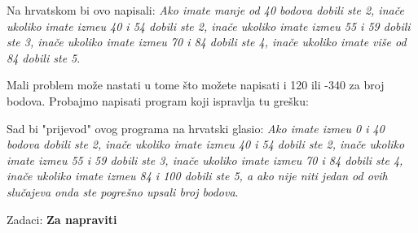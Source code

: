 Na hrvatskom bi ovo napisali: \emph{Ako imate manje od 40 bodova dobili ste 2, ina\v{c}e ukoliko imate
izme\dj{}u 40 i 54 dobili ste 2, ina\v{c}e ukoliko imate izme\dj{}u 55 i 59 dobili ste 3, ina\v{c}e ukoliko imate
izme\dj{}u 70 i 84 dobili ste 4, ina\v{c}e ukoliko imate vi\v{s}e od 84 dobili ste 5}.

Mali problem mo\v{z}e nastati u tome \v{s}to mo\v{z}ete napisati i 120 ili -340 za broj bodova. Probajmo
napisati program koji ispravlja tu gre\v{s}ku:


Sad bi "prijevod" ovog programa na hrvatski glasio: \emph{Ako imate
izme\dj{}u 0 i 40 bodova dobili ste 2, ina\v{c}e ukoliko imate izme\dj{}u
40 i 54 dobili ste 2, ina\v{c}e ukoliko imate izme\dj{}u 55 i 59 dobili
ste 3, ina\v{c}e ukoliko imate izme\dj{}u 70 i 84 dobili ste 4, ina\v{c}e
ukoliko imate izme\dj{}u 84 i 100 dobili ste 5, a ako nije niti jedan
od ovih slu\v{c}ajeva onda ste pogre\v{s}no upsali broj bodova}.

Zadaci: \textbf{Za napraviti}

